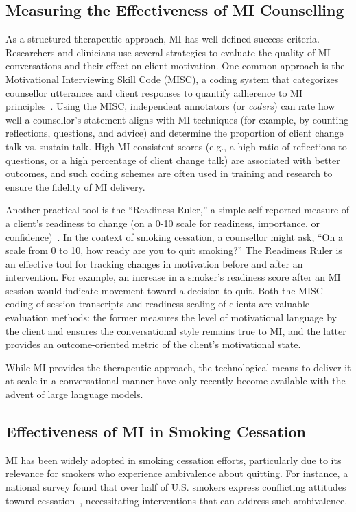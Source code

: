 \subsection*{Measuring the Effectiveness of MI Counselling}
As a structured therapeutic approach, MI has well-defined success criteria. Researchers and clinicians use several strategies to evaluate the quality of MI conversations and their effect on client motivation. One common approach is the Motivational Interviewing Skill Code (MISC), a coding system that categorizes counsellor utterances and client responses to quantify adherence to MI principles~\cite{Houck2010}. Using the MISC, independent annotators (or \emph{coders}) can rate how well a counsellor's statement aligns with MI techniques (for example, by counting reflections, questions, and advice) and determine the proportion of client change talk vs. sustain talk. High MI-consistent scores (e.g., a high ratio of reflections to questions, or a high percentage of client change talk) are associated with better outcomes, and such coding schemes are often used in training and research to ensure the fidelity of MI delivery.

Another practical tool is the ``Readiness Ruler,'' a simple self-reported measure of a client's readiness to change (on a 0-10 scale for readiness, importance, or confidence)~\cite{Boudreaux2012}. In the context of smoking cessation, a counsellor might ask, ``On a scale from 0 to 10, how ready are you to quit smoking?'' The Readiness Ruler is an effective tool for tracking changes in motivation before and after an intervention. For example, an increase in a smoker's readiness score after an MI session would indicate movement toward a decision to quit. Both the MISC coding of session transcripts and readiness scaling of clients are valuable evaluation methods: the former measures the level of motivational language by the client and ensures the conversational style remains true to MI, and the latter provides an outcome-oriented metric of the client's motivational state.

While MI provides the therapeutic approach, the technological means to deliver it at scale in a conversational manner have only recently become available with the advent of large language models.

\subsection{Effectiveness of MI in Smoking Cessation}
MI has been widely adopted in smoking cessation efforts, particularly due to its relevance for smokers who experience ambivalence about quitting. For instance, a national survey found that over half of U.S. smokers express conflicting attitudes toward cessation~\cite{Babb2017}, necessitating interventions that can address such ambivalence.

